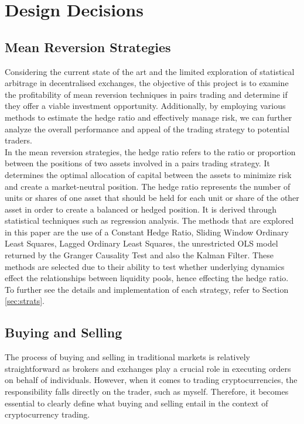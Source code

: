 \chapter{Design Decisions}

\section{Mean Reversion Strategies}
Considering the current state of the art and the limited exploration of statistical arbitrage in decentralised exchanges, the objective of this project is to examine the profitability of mean reversion techniques in pairs trading and determine if they offer a viable investment opportunity. Additionally, by employing various methods to estimate the hedge ratio and effectively manage risk, we can further analyze the overall performance and appeal of the trading strategy to potential traders.
\\[3mm]
In the mean reversion strategies, the hedge ratio refers to the ratio or proportion between the positions of two assets involved in a pairs trading strategy. It determines the optimal allocation of capital between the assets to minimize risk and create a market-neutral position. The hedge ratio represents the number of units or shares of one asset that should be held for each unit or share of the other asset in order to create a balanced or hedged position. It is derived through statistical techniques such as regression analysis. The methods that are explored in this paper are the use of a Constant Hedge Ratio, Sliding Window Ordinary Least Squares, Lagged Ordinary Least Squares, the unrestricted OLS model returned by the Granger Causality Test and also the Kalman Filter. These methods are selected due to their ability to test whether underlying dynamics effect the relationships between liquidity pools, hence effecting the hedge ratio. To further see the details and implementation of each strategy, refer to Section \ref{sec:strats}.

\section{Buying and Selling}
\label{sec:buying-selling}
The process of buying and selling in traditional markets is relatively straightforward as brokers and exchanges play a crucial role in executing orders on behalf of individuals. However, when it comes to trading cryptocurrencies, the responsibility falls directly on the trader, such as myself. Therefore, it becomes essential to clearly define what buying and selling entail in the context of cryptocurrency trading.

